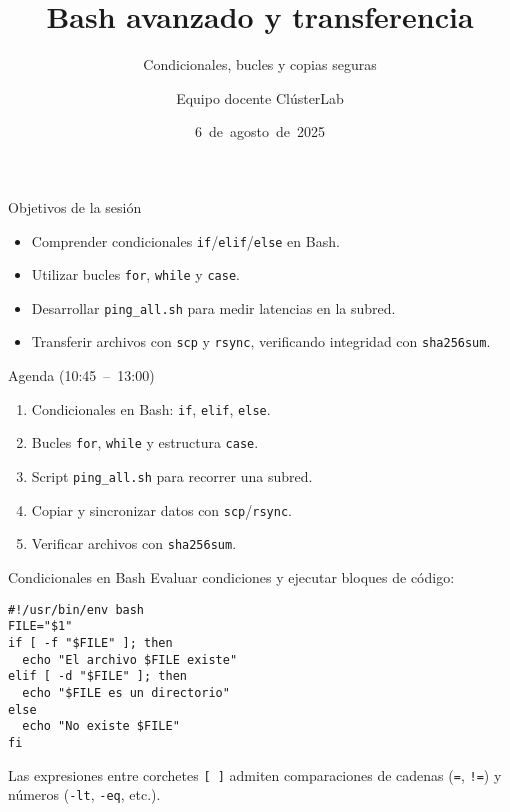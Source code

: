\documentclass[aspectratio=169,professionalfonts]{beamer}
\title[ClústerLab • Día 2]{Bash avanzado y transferencia}
\subtitle{Condicionales, bucles y copias seguras}
\author{Equipo docente ClústerLab}
\date{6 de agosto de 2025}
\begin{document}
\begin{frame}[plain]
  \titlepage
\end{frame}

\begin{frame}[fragile]{Objetivos de la sesión}
  \begin{itemize}
    \item Comprender condicionales \texttt{if}/\texttt{elif}/\texttt{else} en Bash.
    \item Utilizar bucles \texttt{for}, \texttt{while} y \texttt{case}.
    \item Desarrollar \texttt{ping\_all.sh} para medir latencias en la subred.
    \item Transferir archivos con \texttt{scp} y \texttt{rsync}, verificando integridad con \texttt{sha256sum}.
  \end{itemize}
\end{frame}

\begin{frame}[fragile]{Agenda (10:45 – 13:00)}
  \begin{enumerate}
    \item Condicionales en Bash: \texttt{if}, \texttt{elif}, \texttt{else}.
    \item Bucles \texttt{for}, \texttt{while} y estructura \texttt{case}.
    \item Script \texttt{ping\_all.sh} para recorrer una subred.
    \item Copiar y sincronizar datos con \texttt{scp}/\texttt{rsync}.
    \item Verificar archivos con \texttt{sha256sum}.
  \end{enumerate}
\end{frame}

\begin{frame}[fragile]{Condicionales en Bash}
  Evaluar condiciones y ejecutar bloques de código:
  \begin{verbatim}
#!/usr/bin/env bash
FILE="$1"
if [ -f "$FILE" ]; then
  echo "El archivo $FILE existe"
elif [ -d "$FILE" ]; then
  echo "$FILE es un directorio"
else
  echo "No existe $FILE"
fi
  \end{verbatim}
  \begin{infobox}
  Las expresiones entre corchetes \texttt{[ ]} admiten comparaciones de cadenas (\texttt{=}, \texttt{!=}) y números (\texttt{-lt}, \texttt{-eq}, etc.).
  \end{infobox}
\end{frame}
\end{document}
